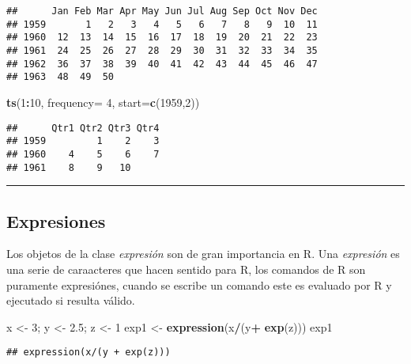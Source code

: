 \documentclass[11pt,]{article}
\newenvironment{Shaded}{\begin{snugshade}}{\end{snugshade}}
\newcommand{\DataTypeTok}[1]{\textcolor[rgb]{0.13,0.29,0.53}{#1}}
\newcommand{\DecValTok}[1]{\textcolor[rgb]{0.00,0.00,0.81}{#1}}
\newcommand{\FloatTok}[1]{\textcolor[rgb]{0.00,0.00,0.81}{#1}}
\newcommand{\KeywordTok}[1]{\textcolor[rgb]{0.13,0.29,0.53}{\textbf{#1}}}
\newcommand{\NormalTok}[1]{#1}
\newcommand{\OperatorTok}[1]{\textcolor[rgb]{0.81,0.36,0.00}{\textbf{#1}}}
\newcommand{\StringTok}[1]{\textcolor[rgb]{0.31,0.60,0.02}{#1}}
\begin{document}
\begin{verbatim}
##      Jan Feb Mar Apr May Jun Jul Aug Sep Oct Nov Dec
## 1959       1   2   3   4   5   6   7   8   9  10  11
## 1960  12  13  14  15  16  17  18  19  20  21  22  23
## 1961  24  25  26  27  28  29  30  31  32  33  34  35
## 1962  36  37  38  39  40  41  42  43  44  45  46  47
## 1963  48  49  50
\end{verbatim}

\begin{Shaded}
\begin{Highlighting}[]
\KeywordTok{ts}\NormalTok{(}\DecValTok{1}\OperatorTok{:}\DecValTok{10}\NormalTok{, }\DataTypeTok{frequency=} \DecValTok{4}\NormalTok{, }\DataTypeTok{start=}\KeywordTok{c}\NormalTok{(}\DecValTok{1959}\NormalTok{,}\DecValTok{2}\NormalTok{))}
\end{Highlighting}
\end{Shaded}

\begin{verbatim}
##      Qtr1 Qtr2 Qtr3 Qtr4
## 1959         1    2    3
## 1960    4    5    6    7
## 1961    8    9   10
\end{verbatim}

\begin{center}\rule{0.5\linewidth}{0.5pt}\end{center}

\hypertarget{expresiones}{%
\subsection{Expresiones}\label{expresiones}}

Los objetos de la clase \emph{expresión} son de gran importancia en R.
Una \emph{expresión} es una serie de caraacteres que hacen sentido para
R, los comandos de R son puramente expresiónes, cuando se escribe un
comando este es evaluado por R y ejecutado si resulta válido.

\begin{Shaded}
\begin{Highlighting}[]
\NormalTok{x <-}\StringTok{ }\DecValTok{3}\NormalTok{; y <-}\StringTok{ }\FloatTok{2.5}\NormalTok{; z <-}\StringTok{ }\DecValTok{1}
\NormalTok{exp1 <-}\StringTok{ }\KeywordTok{expression}\NormalTok{(x}\OperatorTok{/}\NormalTok{(y}\OperatorTok{+}\StringTok{ }\KeywordTok{exp}\NormalTok{(z)))}
\NormalTok{exp1}
\end{Highlighting}
\end{Shaded}

\begin{verbatim}
## expression(x/(y + exp(z)))
\end{verbatim}
\end{document}
